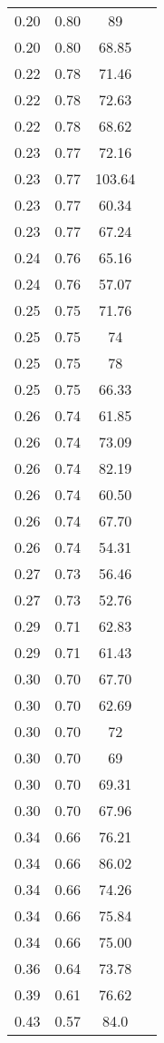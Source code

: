 \begin{longtable}[H]{ c c c c }
	 0.20 & 0.80 & 89 & \cite{Friak2012}\\
	 0.20 & 0.80 & 68.85 & \cite{Karre2015}\\
	 0.22 & 0.78 & 71.46 & \cite{Ozaki2004}\\
	 0.22 & 0.78 & 72.63 & \cite{Karre2015}\\
	 0.22 & 0.78 & 68.62 & \cite{Karre2015}\\
	 0.23 & 0.77 & 72.16 & \cite{Timoshevskii2011}\\
	 0.23 & 0.77 & 103.64 & \cite{Ozaki2004}\\
	 0.23 & 0.77 & 60.34 & \cite{Karre2015}\\
	 0.23 & 0.77 & 67.24 & \cite{Karre2015}\\
	 0.24 & 0.76 & 65.16 & \cite{Karre2015}\\
	 0.24 & 0.76 & 57.07 & \cite{Karre2015}\\
	 0.25 & 0.75 & 71.76 & \cite{Timoshevskii2011}\\
	 0.25 & 0.75 & 74 & \cite{Friak2012}\\
	 0.25 & 0.75 & 78 & \cite{Friak2012}\\
	 0.25 & 0.75 & 66.33 & \cite{Ozaki2004}\\
	 0.26 & 0.74 & 61.85 & \cite{Karre2015}\\
	 0.26 & 0.74 & 73.09 & \cite{Karre2015}\\
	 0.26 & 0.74 & 82.19 & \cite{Ozaki2004}\\
	 0.26 & 0.74 & 60.50 & \cite{Ozaki2004}\\
	 0.26 & 0.74 & 67.70 & \cite{Timoshevskii2011}\\
	 0.26 & 0.74 & 54.31 & \cite{Karre2015}\\
	 0.27 & 0.73 & 56.46 & \cite{Karre2015}\\
	 0.27 & 0.73 & 52.76 & \cite{Karre2015}\\
	 0.29 & 0.71 & 62.83 & \cite{Ozaki2004}\\
	 0.29 & 0.71 & 61.43 & \cite{Ozaki2004}\\
	 0.30 & 0.70 & 67.70 & \cite{Timoshevskii2011}\\
	 0.30 & 0.70 & 62.69 & \cite{Karre2015}\\
	 0.30 & 0.70 & 72 & \cite{Friak2012}\\
	 0.30 & 0.70 & 69 & \cite{Friak2012}\\
	 0.30 & 0.70 & 69.31 & \cite{Karre2015}\\
	 0.30 & 0.70 & 67.96 & \cite{Ozaki2004}\\
	 0.34 & 0.66 & 76.21 & \cite{Karre2015}\\
	 0.34 & 0.66 & 86.02 & \cite{Karre2015}\\
	 0.34 & 0.66 & 74.26 & \cite{Ozaki2004}\\
	 0.34 & 0.66 & 75.84 & \cite{Karre2015}\\
	 0.34 & 0.66 & 75.00 & \cite{Timoshevskii2011}\\
	 0.36 & 0.64 & 73.78 & \cite{Timoshevskii2011}\\
	 0.39 & 0.61 & 76.62 & \cite{Timoshevskii2011}\\
	 0.43 & 0.57 & 84.0 & \cite{Ozaki2004}\\
	\hline
\end{longtable}
